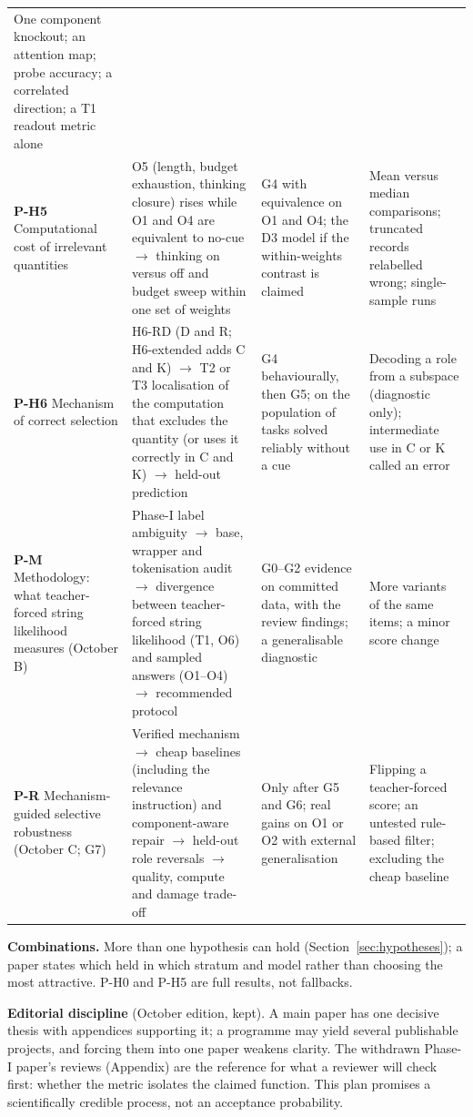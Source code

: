 \documentclass[10pt,a4paper]{article}
\begin{document}
\begin{center}
\begin{tabularx}{\linewidth}{@{}P{3.4cm}LLL@{}}
One component knockout; an attention map; probe accuracy; a correlated direction; a T1 readout metric alone \\
\textbf{P-H5} Computational cost of irrelevant quantities &
O5 (length, budget exhaustion, thinking closure) rises while O1 and O4 are equivalent to no-cue $\to$ thinking on
versus off and budget sweep within one set of weights &
G4 with equivalence on O1 and O4; the D3 model if the within-weights contrast is claimed &
Mean versus median comparisons; truncated records relabelled wrong; single-sample runs \\
\textbf{P-H6} Mechanism of correct selection &
H6-RD (D and R; H6-extended adds C and K) $\to$ T2 or T3 localisation of the computation that excludes the
quantity (or uses it correctly in C and K) $\to$ held-out prediction &
G4 behaviourally, then G5; on the population of tasks solved reliably without a cue &
Decoding a role from a subspace (diagnostic only); intermediate use in C or K called an error \\
\textbf{P-M} Methodology: what teacher-forced string likelihood measures (October B) &
Phase-I label ambiguity $\to$ base, wrapper and tokenisation audit $\to$ divergence between teacher-forced
string likelihood (T1, O6) and sampled answers (O1--O4) $\to$ recommended protocol &
G0--G2 evidence on committed data, with the review findings; a generalisable diagnostic &
More variants of the same items; a minor score change \\
\textbf{P-R} Mechanism-guided selective robustness (October C; G7) &
Verified mechanism $\to$ cheap baselines (including the relevance instruction) and component-aware repair $\to$
held-out role reversals $\to$ quality, compute and damage trade-off &
Only after G5 and G6; real gains on O1 or O2 with external generalisation &
Flipping a teacher-forced score; an untested rule-based filter; excluding the cheap baseline \\
\bottomrule
\end{tabularx}
\end{center}

\textbf{Combinations.} More than one hypothesis can hold (Section~\ref{sec:hypotheses}); a paper states which held
in which stratum and model rather than choosing the most attractive. P-H0 and P-H5 are full results, not fallbacks.

\textbf{Editorial discipline} (October edition, kept). A main paper has one decisive thesis with appendices
supporting it; a programme may yield several publishable projects, and forcing them into one paper weakens
clarity. The withdrawn Phase-I paper's reviews (Appendix) are the reference for what a reviewer will check first:
whether the metric isolates the claimed function. This plan promises a scientifically credible process, not an
acceptance probability.
\end{document}
